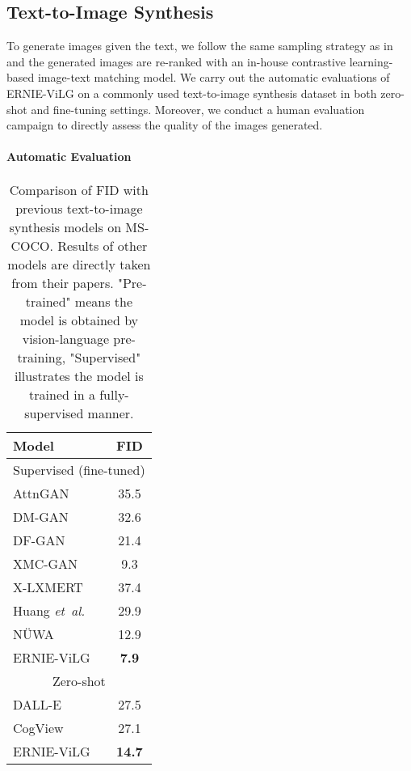 \documentclass{article}
\begin{document}
\subsection{Text-to-Image Synthesis}
To generate images given the text, we follow the same sampling strategy as in \cite{ramesh2021zero} and the generated images are re-ranked with an in-house contrastive learning-based image-text matching model. We carry out the automatic evaluations of ERNIE-ViLG on a commonly used text-to-image synthesis dataset in both zero-shot and fine-tuning settings. Moreover, we conduct a human evaluation campaign to directly assess the quality of the images generated. 
\paragraph{Automatic Evaluation}

\begin{table}[htb]
 \caption{Comparison of FID with previous text-to-image synthesis models on MS-COCO. Results of other models are directly taken from their papers. "Pre-trained" means the model is obtained by vision-language pre-training, "Supervised" illustrates the model is trained in a fully-supervised manner.}
  \centering
  \begin{tabular}{l|c}
    \toprule
    Model & FID  \\
    \midrule
    \multicolumn{2}{c}{Supervised (fine-tuned)}\\
    \toprule
    AttnGAN \cite{xu2018attngan} & 35.5 \\
    DM-GAN \cite{zhu2019dm} & 32.6 \\
    DF-GAN \cite{tao2020df} & 21.4 \\
    XMC-GAN \cite{zhang2021cross} & 9.3 \\
    X-LXMERT \cite{cho2020x} & 37.4 \\ 
    Huang {\em et\ al.} \cite{huang2021unifying} & 29.9 \\
    NÜWA \cite{wu2021n} & 12.9 \\
    ERNIE-ViLG & \textbf{7.9} \\
    \bottomrule
    \multicolumn{2}{c}{Zero-shot}\\
    \toprule
    DALL-E \cite{ramesh2021zero} & 27.5 \\
    CogView \cite{ding2021cogview} & 27.1 \\
    ERNIE-ViLG & \textbf{14.7} \\
    \bottomrule
  \end{tabular}
  \label{exp-zero-t2i-auto-result}
\end{table}
\end{document}
